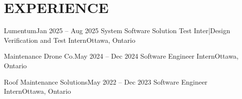 \section{\textbf {\large EXPERIENCE}}
\resumeSubHeadingListStart

    \resumeSubheading
    {Lumentum}{Jan 2025 -- Aug 2025}
    {System Software Solution Test Inter|Design Verification and Test Intern}{Ottawa, Ontario}
    \resumeItemListStart
        \resumeItem{}
        \resumeItem{}
        \resumeItem{}
    \resumeItemListEnd
    
    \resumeSubheading
    {Maintenance Drone Co.}{May 2024 -- Dec 2024}
    {Software Engineer Intern}{Ottawa, Ontario}
    \resumeItemListStart
        \resumeItem{}
        \resumeItem{}
        \resumeItem{}
    \resumeItemListEnd

    \resumeSubheading
    {Roof Maintenance Solutions}{May 2022 -- Dec 2023}
    {Software Engineer Intern}{Ottawa, Ontario}
    \resumeItemListStart
        \resumeItem{}
        \resumeItem{}
    \resumeItemListEnd
    

\resumeSubHeadingListEnd